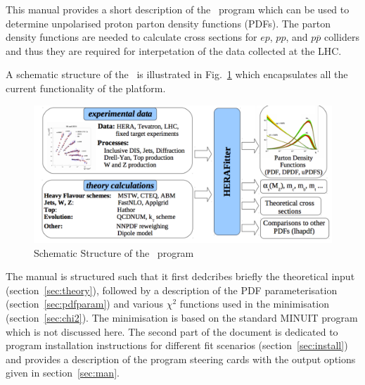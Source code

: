 \label{section:introduction}
This manual provides a short description of the \fitter\ program 
which can be used to determine unpolarised proton parton density functions 
(PDFs). 
The parton density functions are needed to calculate cross sections
for $ep$, $pp$, and $p\overline{p}$ colliders and thus they are required for interpetation
of the data collected at the LHC.

A schematic structure of the \fitter\ is illustrated in Fig.~\ref{fig:flow} which encapsulates all the current functionality of the platform.
\begin{figure}
\begin{center}
\caption{Schematic Structure of the \fitter\ program}
\includegraphics[width=0.75\linewidth]{figures/flow.pdf}
\end{center}
\label{fig:flow}
\end{figure}

The manual is structured such that it first dedcribes briefly the
 theoretical input (section~\ref{sec:theory}), followed by a description of the
PDF parameterisation (section~\ref{sec:pdfparam}) and various $\chi^2$ functions used in the minimisation (section~\ref{sec:chi2}). The minimisation is based on the standard MINUIT program \cite{MINUIT} which is not discussed here.
The second part of the document is dedicated to program installation instructions for different fit scenarios (section~\ref{sec:install}) and provides a description of the program steering cards with the output options given in section~\ref{sec:man}.
